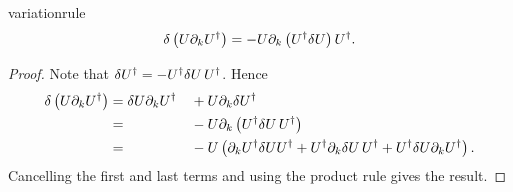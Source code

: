 \begin{lemma}{}{variationrule}
  $$\var\left(U\partial_kU^\dagger\right)
   =-U\partial_k\left(U^\dagger\var U\right)U^\dagger.$$
\begin{proof} Note that $\var U^\dagger=-U^\dagger\var U\,U^\dagger$. Hence
  \begin{alignat*}{2}
   \var\left(U\partial_kU^\dagger\right)
    &=\var U\partial_kU^\dagger&&+U\partial_k\var U^\dagger\\
    &=                           &&-U\partial_k\left(U^\dagger\var
                                                     U\,U^\dagger\right)\\
    &=                           &&-U\left(\partial_kU^\dagger\var UU^\dagger
                                        +U^\dagger\partial_k\var U\,U^\dagger
                                        +U^\dagger\var U\partial_k
                                         U^\dagger                     \right).
  \end{alignat*}
  Cancelling the first and last terms and using the product rule gives the
  result.
\end{proof}
\end{lemma}

